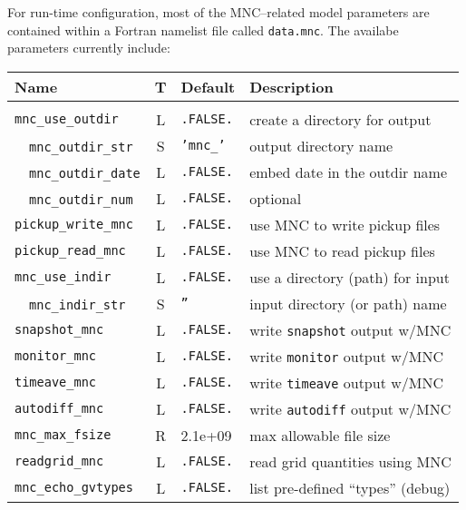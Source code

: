 For run-time configuration, most of the MNC--related model parameters
are contained within a Fortran namelist file called
\texttt{data.mnc}.  The availabe parameters currently include:
\begin{center}
  {\footnotesize
    \begin{tabular}[htb]{|l|c|l|l|}\hline
      \textbf{Name}  &  \textbf{T}  &  
      \textbf{Default}  &  \textbf{Description}  \\\hline
      &  &  &  \\
      \texttt{mnc\_use\_outdir}  &  L  & \texttt{.FALSE.}  &  
      create a directory for output  \\
      \ \ \texttt{mnc\_outdir\_str}  &  S  & \texttt{'mnc\_'}  &  
      output directory name \\
      \ \ \texttt{mnc\_outdir\_date}  &  L  & \texttt{.FALSE.}  &  
      embed date in the outdir name  \\
      \ \ \texttt{mnc\_outdir\_num}  &  L  & \texttt{.FALSE.}  &  
      optional  \\
      \texttt{pickup\_write\_mnc}  &  L  & \texttt{.FALSE.}  &  
      use MNC to write pickup files  \\
      \texttt{pickup\_read\_mnc}  &  L  & \texttt{.FALSE.}  &  
      use MNC to read pickup files  \\
      \texttt{mnc\_use\_indir}  &  L  & \texttt{.FALSE.}  &  
      use a directory (path) for input  \\
      \ \ \texttt{mnc\_indir\_str}  &  S  & \texttt{''}  &  
      input directory (or path) name  \\
      \texttt{snapshot\_mnc}  &  L  & \texttt{.FALSE.}  &  
      write \texttt{snapshot} output w/MNC  \\
      \texttt{monitor\_mnc}  &  L  & \texttt{.FALSE.}  &  
      write \texttt{monitor} output w/MNC  \\
      \texttt{timeave\_mnc}  &  L  & \texttt{.FALSE.}  &  
      write \texttt{timeave} output w/MNC  \\
      \texttt{autodiff\_mnc}  &  L  & \texttt{.FALSE.}  &  
      write \texttt{autodiff} output w/MNC  \\
      \texttt{mnc\_max\_fsize}  &  R  & 2.1e+09  &  
      max allowable file size  \\
      \texttt{readgrid\_mnc}  &  L  &  \texttt{.FALSE.}  &  
      read grid quantities using MNC  \\
      \texttt{mnc\_echo\_gvtypes}  &  L  & \texttt{.FALSE.}  &  
      list pre-defined ``types'' (debug)   \\\hline
    \end{tabular}
  }
\end{center}

